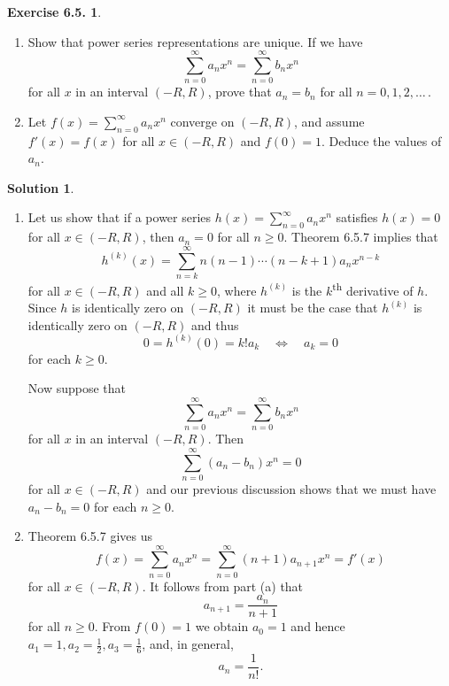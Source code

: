 \documentclass[12pt]{article}
\theoremstyle{definition}
\theoremstyle{exercise}
\newtheorem{exercise}{Exercise 6.5.}
\theoremstyle{solution}
\newtheorem*{solution}{Solution}
\newcommand{\ts}{\textsuperscript}
\newcommand{\quiff}{\quad \iff \quad}
\begin{document}
\begin{exercise}
\label{ex:8}
    \begin{enumerate}
        \item Show that power series representations are unique. If we have
        \[
            \sum_{n=0}^{\infty} a_n x^n = \sum_{n=0}^{\infty} b_n x^n
        \]
        for all \( x \) in an interval \( (-R, R) \), prove that \( a_n = b_n \) for all \( n = 0, 1, 2, \ldots \, \).

        \item Let \( f(x) = \sum_{n=0}^{\infty} a_n x^n \) converge on \( (-R, R) \), and assume \( f'(x) = f(x) \) for all \( x \in (-R, R) \) and \( f(0) = 1 \). Deduce the values of \( a_n \).
    \end{enumerate}
\end{exercise}

\begin{solution}
    \begin{enumerate}
        \item Let us show that if a power series \( h(x) = \sum_{n=0}^{\infty} a_n x^n \) satisfies \( h(x) = 0 \) for all \( x \in (-R, R) \), then \( a_n = 0 \) for all \( n \geq 0 \). Theorem 6.5.7 implies that
        \[
            h^{(k)}(x) = \sum_{n=k}^{\infty} n (n - 1) \cdots (n - k + 1) a_n x^{n - k}
        \]
        for all \( x \in (-R, R) \) and all \( k \geq 0 \), where \( h^{(k)} \) is the \( k \)\ts{th} derivative of \( h \). Since \( h \) is identically zero on \( (-R, R) \) it must be the case that \( h^{(k)} \) is identically zero on \( (-R, R) \) and thus
        \[
            0 = h^{(k)}(0) = k! a_k \quiff a_k = 0
        \]
        for each \( k \geq 0 \).

        Now suppose that
        \[
            \sum_{n=0}^{\infty} a_n x^n = \sum_{n=0}^{\infty} b_n x^n
        \]
        for all \( x \) in an interval \( (-R, R) \). Then
        \[
            \sum_{n=0}^{\infty} (a_n - b_n) x^n = 0
        \]
        for all \( x \in (-R, R) \) and our previous discussion shows that we must have \( a_n - b_n = 0 \) for each \( n \geq 0 \).

        \item Theorem 6.5.7 gives us
        \[
            f(x) = \sum_{n=0}^{\infty} a_n x^n = \sum_{n=0}^{\infty} (n + 1) a_{n+1} x^n = f'(x)
        \]
        for all \( x \in (-R, R) \). It follows from part (a) that
        \[
            a_{n+1} = \frac{a_n}{n + 1}
        \]
        for all \( n \geq 0 \). From \( f(0) = 1 \) we obtain \( a_0 = 1 \) and hence \( a_1 = 1, a_2 = \tfrac{1}{2}, a_3 = \tfrac{1}{6} \), and, in general,
        \[
            a_n = \frac{1}{n!}.
        \]
    \end{enumerate}
\end{solution}
\end{document}
